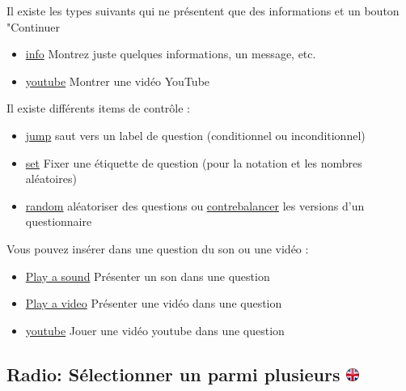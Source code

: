 \documentclass[
]{book}
\providecommand{\tightlist}{%
  \setlength{\itemsep}{0pt}\setlength{\parskip}{0pt}}
\begin{document}
Il existe les types suivants qui ne présentent que des informations et un bouton "Continuer

\begin{itemize}
\tightlist
\item
  \protect\hyperlink{info}{info} Montrez juste quelques informations, un message, etc.
\item
  \protect\hyperlink{youtube}{youtube} Montrer une vidéo YouTube
\end{itemize}

Il existe différents items de contrôle :

\begin{itemize}
\tightlist
\item
  \protect\hyperlink{jump}{jump} saut vers un label de question (conditionnel ou inconditionnel)
\item
  \protect\hyperlink{scoring}{set} Fixer une étiquette de question (pour la notation et les nombres aléatoires)
\item
  \protect\hyperlink{randomization}{random} aléatoriser des questions ou \protect\hyperlink{randomjump}{contrebalancer} les versions d'un questionnaire
\end{itemize}

Vous pouvez insérer dans une question du son ou une vidéo :

\begin{itemize}
\tightlist
\item
  \protect\hyperlink{playasound}{Play a sound} Présenter un son dans une question
\item
  \protect\hyperlink{playavideo}{Play a video} Présenter une vidéo dans une question
\item
  \protect\hyperlink{youtube}{youtube} Jouer une vidéo youtube dans une question
\end{itemize}

\hypertarget{radio-suxe9lectionner-un-parmi-plusieurs}{%
\subsection[Radio: Sélectionner un parmi plusieurs ]{\texorpdfstring{Radio: Sélectionner un parmi plusieurs \href{https://www.psytoolkit.org/doc3.4.0/online-survey-syntax.html\#radio}{\protect\includegraphics{img/ukflag.png}}}{Radio: Sélectionner un parmi plusieurs }}\label{radio-suxe9lectionner-un-parmi-plusieurs}}
\end{document}
